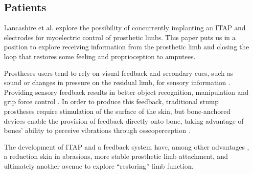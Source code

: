 \subsection{Patients}
Lancashire et al. explore the possibility of concurrently implanting an ITAP and electrodes for myoelectric control of prosthetic limbs.
This paper puts us in a position to explore receiving information from the prosthetic limb and closing the loop that restores some feeling and proprioception to amputees.

Prostheses users tend to rely on visual feedback and secondary cues, such as sound or changes in pressure on the residual limb, for sensory information \cite{schofield_applications_2014}.
Providing sensory feedback results in better object recognition, manipulation and grip force control \cite{schiefer_artificial_2018, rosenbaum-chou_development_2016}.
In order to produce this feedback, traditional stump prostheses require stimulation of the surface of the skin, but bone-anchored devices enable the provision of feedback directly onto bone, taking advantage of bones' ability to perceive vibrations through osseoperception \cite{OrgelMarcus2021Oito}.

The development of ITAP and a feedback system have, among other advantages \cite{Hagberg2008}, a reduction skin in abrasions, more stable prosthetic limb attachment, and ultimately another avenue to explore ``restoring'' limb function.